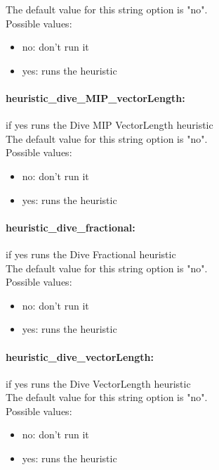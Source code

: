 The default value for this string option is "no".
\\ 
Possible values:
\begin{itemize}
   \item no: don't run it
   \item yes: runs the heuristic
\end{itemize}

\paragraph{heuristic\_dive\_MIP\_vectorLength:}\label{sec:heuristic_dive_MIP_vectorLength} if yes runs the Dive MIP VectorLength heuristic $\;$ \\

The default value for this string option is "no".
\\ 
Possible values:
\begin{itemize}
   \item no: don't run it
   \item yes: runs the heuristic
\end{itemize}

\paragraph{heuristic\_dive\_fractional:}\label{sec:heuristic_dive_fractional} if yes runs the Dive Fractional heuristic $\;$ \\

The default value for this string option is "no".
\\ 
Possible values:
\begin{itemize}
   \item no: don't run it
   \item yes: runs the heuristic
\end{itemize}

\paragraph{heuristic\_dive\_vectorLength:}\label{sec:heuristic_dive_vectorLength} if yes runs the Dive VectorLength heuristic $\;$ \\

The default value for this string option is "no".
\\ 
Possible values:
\begin{itemize}
   \item no: don't run it
   \item yes: runs the heuristic
\end{itemize}

